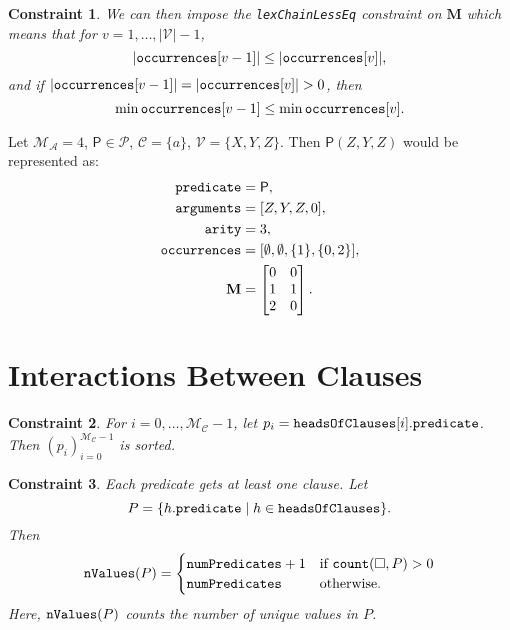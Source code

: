 \documentclass[runningheads]{llncs}
\newtheorem{constraint}{Constraint}
\newcommand{\variable}[1]{\texttt{\textup{#1}}}
\newcommand{\predicates}{\mathcal{P}}
\newcommand{\variables}{\mathcal{V}}
\newcommand{\constants}{\mathcal{C}}
\newcommand{\maxArity}{\mathcal{M}_{\mathcal{A}}}
\newcommand{\maxNumClauses}{\mathcal{M}_{\mathcal{C}}}
\begin{document}
\begin{constraint}
  We can then impose the \variable{lexChainLessEq} constraint on $\mathbf{M}$
  which means that for $v = 1, \dots, |\variables{}| - 1$,
  \[
    |\variable{occurrences}[v - 1]| \le |\variable{occurrences}[v]|,
  \]
  and if $|\variable{occurrences}[v - 1]| = |\variable{occurrences}[v]| > 0$,
  then
  \[
    \min \variable{occurrences}[v - 1] \le \min \variable{occurrences}[v].
  \]
\end{constraint}

\begin{example}
  Let $\maxArity{} = 4$, $\mathsf{P} \in \predicates{}$, $\constants{} = \{ a
  \}$, $\variables{} = \{X, Y, Z \}$. Then $\mathsf{P}(Z, Y, Z)$ would be
  represented as:
  \begin{align*}
    \variable{predicate} &= \mathsf{P},\\
    \variable{arguments} &= [Z, Y, Z, 0],\\
    \variable{arity} &= 3,\\
    \variable{occurrences} &= [\emptyset, \emptyset, \{ 1 \}, \{ 0, 2 \}],\\
    \mathbf{M} &= \begin{bmatrix}
      0 & 0\\
      1 & 1\\
      2 & 0
    \end{bmatrix}.
  \end{align*}
\end{example}

\section{Interactions Between Clauses}

\begin{constraint}
  For $i = 0, \dots, \maxNumClauses - 1$, let $p_i =
  \variable{headsOfClauses}[i].\variable{predicate}$. Then
  $(p_i)_{i=0}^{\maxNumClauses - 1}$ is sorted.
\end{constraint}

\begin{constraint}
  Each predicate gets at least one clause. Let
  \[
    P = \{ h.\variable{predicate} \mid h \in \variable{headsOfClauses} \}.
  \]
  Then
  \[
    \variable{nValues}(P) =
    \begin{cases}
      \variable{numPredicates} + 1 & \text{if } \variable{count}(\Box, P) > 0 \\
      \variable{numPredicates} & \text{otherwise.}
    \end{cases}
  \]
  Here, $\variable{nValues}(P)$ counts the number of unique values in $P$.
\end{constraint}
\end{document}
